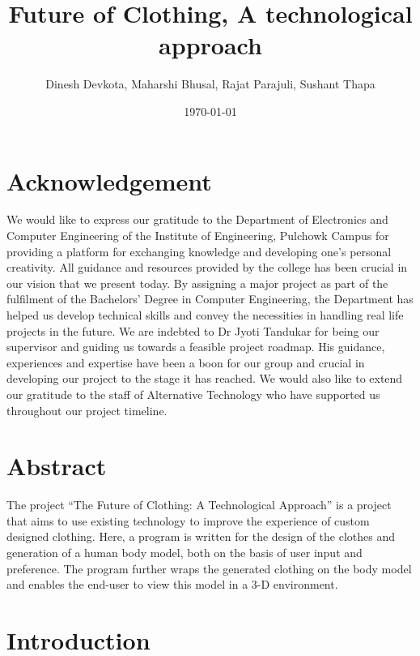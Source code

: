 \documentclass{article}
\title{Future of Clothing, A technological approach}
\author{Dinesh Devkota,
Maharshi Bhusal, Rajat Parajuli, Sushant Thapa}
\date{\today}
\begin{document}
\maketitle
\newpage

    \section*{Acknowledgement}
We would like to express our gratitude to the Department of Electronics and Computer Engineering of the Institute of Engineering, Pulchowk Campus for providing a platform for exchanging knowledge and developing one’s personal creativity. All guidance and resources provided by the college has been crucial in our vision that we present today. By assigning a major project as part of the fulfilment of the Bachelors’ Degree in Computer Engineering, the Department has helped us develop technical skills and convey the necessities in handling real life projects in the future.
We are indebted to Dr Jyoti Tandukar for being our supervisor and guiding us towards a feasible project roadmap. His guidance, experiences and expertise have been a boon for our group and crucial in developing our project to the stage it has reached. We would also like to extend our gratitude to the staff of Alternative Technology who have supported us throughout our project timeline.



\newpage

\section*{Abstract}
The project “The Future of Clothing: A Technological Approach” is a project that aims to use existing technology to improve the experience of custom designed clothing. Here, a program is written for the design of the clothes and generation of a human body model, both on the basis of user input and preference. The program further wraps the generated clothing on the body model and enables the end-user to view this model in a 3-D environment.
\newpage

\tableofcontents
\listoffigures


\newpage
{}
\section{Introduction}
\end{document}
